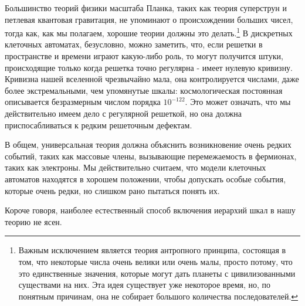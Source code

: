 \documentclass[main.tex]{subfiles}
\begin{document}
Большинство теорий физики масштаба Планка, таких как теория суперструн и петлевая квантовая гравитация, не упоминают о происхождении больших чисел, тогда как, как мы полагаем, хорошие теории должны это делать.\footnote{Важным исключением является теория антропного принципа, состоящая в том, что некоторые числа очень велики или очень малы, просто потому, что это единственные значения, которые могут дать планеты с цивилизованными существами на них. Эта идея существует уже некоторое время, но, по понятным причинам, она не собирает большого количества последователей.} В дискретных клеточных автоматах, безусловно, можно заметить, что, если решетки в пространстве и времени играют какую-либо роль, то могут получится штуки, происходящие только когда решетка точно регулярна - имеет нулевую кривизну. Кривизна нашей вселенной чрезвычайно мала, она контролируется числами, даже более экстремальными, чем упомянутые шкалы: космологическая постоянная описывается безразмерным числом порядка $10^{-122}$. Это может означать, что мы действительно имеем дело с регулярной решеткой, но она должна приспосабливаться к редким решеточным дефектам.

В общем, универсальная теория должна объяснить возникновение очень редких событий, таких как массовые члены, вызывающие перемежаемость в фермионах, таких как электроны. Мы действительно считаем, что модели клеточных автоматов находятся в хорошем положении, чтобы допускать особые события, которые очень редки, но слишком рано пытаться понять их.

Короче говоря, наиболее естественный способ включения иерархий шкал в нашу теорию не ясен.
\end{document}
